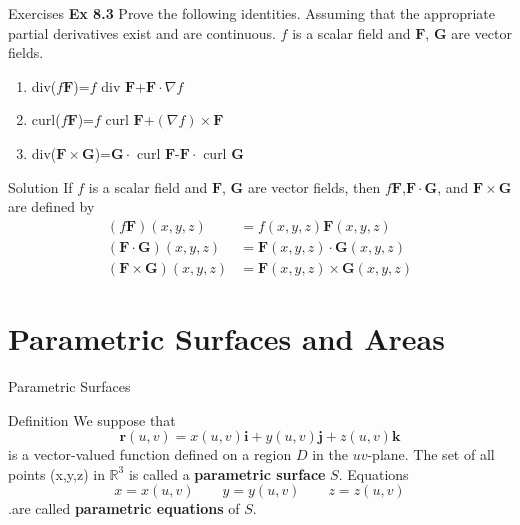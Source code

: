 \documentclass[aspectratio=169]{beamer}
\begin{document}
\begin{frame}{Exercises}
    \textbf{Ex 8.3} Prove the following identities. Assuming that the appropriate partial derivatives exist and are continuous. $f$ is a scalar field and $\boldsymbol{F}$, $\boldsymbol{G}$ are vector fields.\\
    \begin{enumerate}
        \item div($f\boldsymbol{F}$)=$f$ div $\boldsymbol{F}$+$\boldsymbol{F}\cdot \nabla f$
         \item curl($f\boldsymbol{F}$)=$f$ curl $\boldsymbol{F}$+$(\nabla f)\times\boldsymbol{F}$
         \item div($\boldsymbol{F}\times\boldsymbol{G}$)=$\boldsymbol{G}\cdot$ curl $\boldsymbol{F}$-$\boldsymbol{F}\cdot$ curl $\boldsymbol{G}$
    \end{enumerate}
    
\end{frame}

\begin{frame}{Solution}
    If $f$ is a scalar field and $\boldsymbol{F}$, $\boldsymbol{G}$ are vector fields, then $f\boldsymbol{F}$,$\boldsymbol{F}\cdot\boldsymbol{G}$, and $\boldsymbol{F}\times\boldsymbol{G}$ are defined by
    \begin{align*}
        (f\boldsymbol{F})(x,y,z)&=f(x,y,z)\boldsymbol{F}(x,y,z)\\
        (\boldsymbol{F}\cdot\boldsymbol{G})(x,y,z)&=\boldsymbol{F}(x,y,z)\cdot\boldsymbol{G}(x,y,z)\\
        (\boldsymbol{F}\times\boldsymbol{G})(x,y,z)&=\boldsymbol{F}(x,y,z)\times\boldsymbol{G}(x,y,z)
    \end{align*}
\end{frame}

\section{Parametric Surfaces and Areas}

\begin{frame}{Parametric Surfaces}
    \begin{block}{Definition}
        We suppose that 
        \begin{equation*}
            \boldsymbol{r}(u,v)=x(u,v)\boldsymbol{i}+y(u,v)\boldsymbol{j}+z(u,v)\boldsymbol{k}
        \end{equation*}
        is a vector-valued function defined on a region $D$ in the $uv$-plane. The set of all points (x,y,z) in $\mathbb{R}^3$ is called a \textbf{parametric surface} $S$. Equations
        \begin{equation*}
            x=x(u,v)\qquad y=y(u,v) \qquad z=z(u,v)
        \end{equation*}
        .are called \textbf{parametric equations} of $S$.
    \end{block}
\end{frame}
\end{document}
